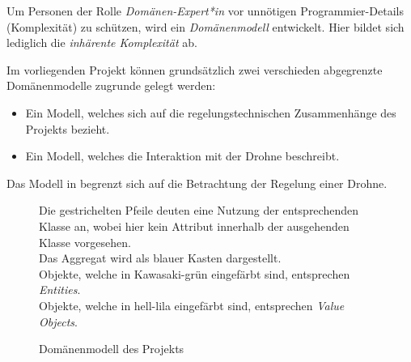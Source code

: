 
Um Personen der  Rolle \textit{Domänen-Expert*in} vor unnötigen Programmier-Details (Komplexität) zu schützen, wird ein \textit{Domänenmodell} entwickelt. Hier bildet sich lediglich die \textit{inhärente Komplexität} ab.

Im vorliegenden Projekt können grundsätzlich zwei verschieden abgegrenzte Domänenmodelle zugrunde gelegt werden:
\begin{itemize}
\item Ein Modell, welches sich auf die regelungstechnischen Zusammenhänge des Projekts bezieht.
\item Ein Modell, welches die Interaktion mit der Drohne beschreibt.
\end{itemize}

Das Modell in  begrenzt sich auf die Betrachtung der Regelung einer Drohne. 

\begin{figure}[ht!]
\vspace{0.25cm}
\begin{center}
\caption{Domänenmodell des Projekts}
\label{fig:DomainMod}
\end{center}

\vspace{0.25cm}
Die gestrichelten Pfeile deuten eine Nutzung der entsprechenden Klasse an, wobei hier kein Attribut innerhalb der ausgehenden Klasse vorgesehen.\\
Das Aggregat wird als blauer Kasten dargestellt.\\
Objekte, welche in Kawasaki-grün eingefärbt sind, entsprechen \textit{Entities}.\\
Objekte, welche in hell-lila eingefärbt sind, entsprechen \textit{Value Objects}.
\end{figure}






